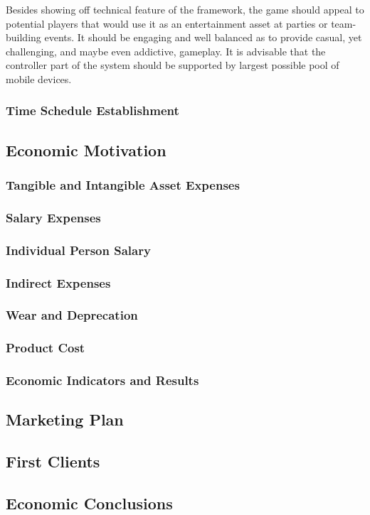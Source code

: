 Besides showing off technical feature of the framework, the game should appeal to potential players that would use it as an entertainment asset at parties or team-building events. It should be engaging and well balanced as to provide casual, yet challenging, and maybe even addictive, gameplay. It is advisable that the controller part of the system should be supported by largest possible pool of mobile devices.

\subsubsection{Time Schedule Establishment}

\subsection{Economic Motivation}

\subsubsection{Tangible and Intangible Asset Expenses}

\subsubsection{Salary Expenses}

\subsubsection{Individual Person Salary}

\subsubsection{Indirect Expenses}

\subsubsection{Wear and Deprecation}

\subsubsection{Product Cost}

\subsubsection{Economic Indicators and Results}

\subsection{Marketing Plan}

\subsection{First Clients}

\subsection{Economic Conclusions}






\clearpage
